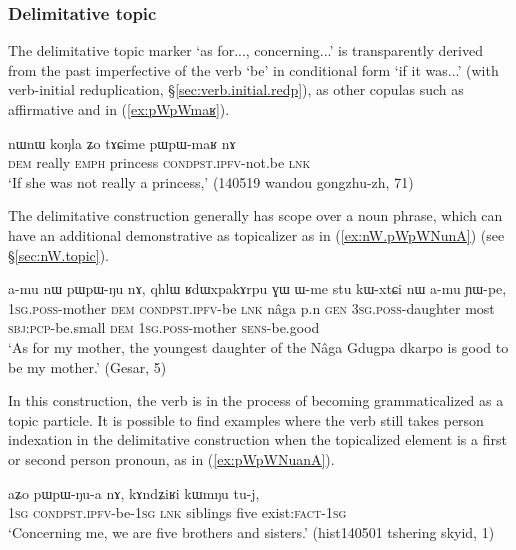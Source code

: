   \subsubsection{Delimitative topic} \label{sec:delimitative}
The delimitative topic marker  `as for..., concerning...' is transparently derived from the past imperfective of the verb `be' in conditional form `if it was...' (with verb-initial reduplication, §\ref{sec:verb.initial.redp}), as other copulas such as affirmative  and  in (\ref{ex:pWpWmaʁ}).

\begin{exe}
\ex \label{ex:pWpWmaʁ}
\gll nɯnɯ koŋla ʑo tɤɕime pɯ\redp{}pɯ-maʁ nɤ \\
\textsc{dem} really \textsc{emph} princess \textsc{cond}\redp{}\textsc{pst}.\textsc{ipfv}-not.be \textsc{lnk} \\
\glt `If she was not really a princess,' (140519 wandou gongzhu-zh, 71)
\end{exe}

The delimitative construction generally has scope over a noun phrase, which can have an additional demonstrative  as topicalizer as in (\ref{ex:nW.pWpWNunA}) (see §\ref{sec:nW.topic}).

\begin{exe}
\ex \label{ex:nW.pWpWNunA}
\gll a-mu nɯ pɯ\redp{}pɯ-ŋu nɤ, qhlɯ ʁdɯxpakɤrpu ɣɯ ɯ-me stu kɯ-xtɕi nɯ a-mu ɲɯ-pe, \\
\textsc{1sg}.\textsc{poss}-mother \textsc{dem} \textsc{cond}\redp{}\textsc{pst}.\textsc{ipfv}-be \textsc{lnk} nâga p.n \textsc{gen} \textsc{3sg}.\textsc{poss}-daughter most \textsc{sbj}:\textsc{pcp}-be.small \textsc{dem} \textsc{1sg}.\textsc{poss}-mother \textsc{sens}-be.good \\
\glt `As for my mother, the youngest daughter of the Nâga Gdugpa dkarpo is good to be my mother.' (Gesar, 5)
\end{exe}

In this construction, the verb is in the process of becoming grammaticalized as a topic particle. It is possible to find examples where the verb still takes person indexation in the delimitative construction when the topicalized element is a first or second person pronoun, as in (\ref{ex:pWpWNuanA}). 

\begin{exe}
\ex \label{ex:pWpWNuanA}
\gll aʑo pɯ\redp{}pɯ-ŋu-a nɤ, kɤndʑiʁi kɯmŋu tu-j, \\
\textsc{1sg} \textsc{cond}\redp{}\textsc{pst}.\textsc{ipfv}-be-\textsc{1sg} \textsc{lnk} siblings five exist:\textsc{fact}-\textsc{1sg} \\
\glt `Concerning me, we are five brothers and sisters.' (hist140501 tshering skyid, 1)
\end{exe}

